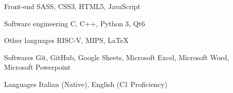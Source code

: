 

\begin{cvskills}

  \cvskill
    {Front-end} %
    {SASS, CSS3, HTML5, JavaScript} %

  \cvskill
    {Software engineering} %
    {C, C++, Python 3, Qt6} %

  \cvskill
    {Other languages} %
    {RISC-V, MIPS, LaTeX} %

  \cvskill
    {Softwares} %
    {Git, GitHub, Google Sheets, Microsoft Excel, Microsoft Word, Microsoft Powerpoint} %

  \cvskill
    {Languages} %
    {Italian (Native), English (C1 Proficiency)} %

\end{cvskills}

